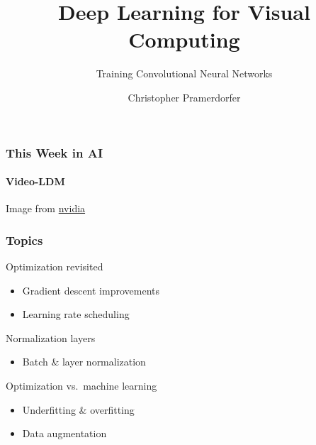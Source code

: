 \documentclass[xetex,professionalfont]{beamer}
\title{Deep Learning for Visual Computing}
\subtitle{Training Convolutional Neural Networks}
\author{Christopher Pramerdorfer}
\institute{Computer Vision Lab, TU Wien}
\begin{document}
\begin{frame}
\maketitle
\end{frame}


\begin{frame}
  \frametitle{This Week in AI}
  \framesubtitle{Video-LDM}
  
  \begin{center}
    {\centering Image from \href{https://research.nvidia.com/labs/toronto-ai/VideoLDM/}{nvidia}}
  \end{center}
    
\end{frame}


\begin{frame}
\frametitle{Topics}

Optimization revisited
\begin{itemize}
  \item Gradient descent improvements
  \item Learning rate scheduling
\end{itemize}

\bigskip

Normalization layers
\begin{itemize}
  \item Batch \& layer normalization
\end{itemize}

\bigskip

Optimization vs.~machine learning
\begin{itemize}
    \item Underfitting \& overfitting
    \item Data augmentation
\end{itemize}

\end{frame}
\end{document}
